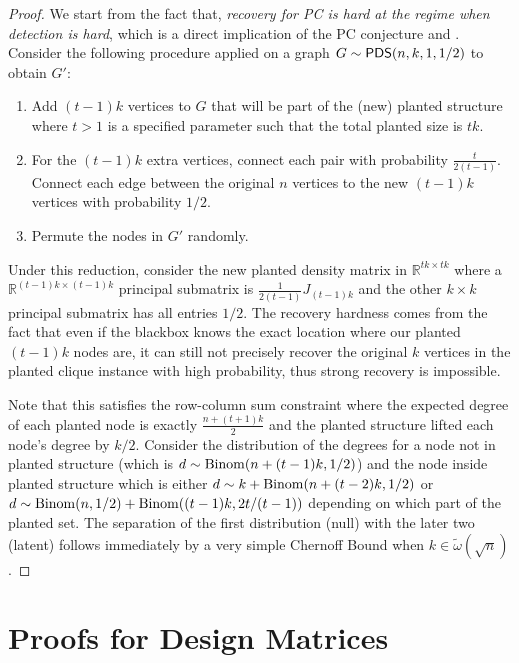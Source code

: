 \documentclass[final,12pt]{colt2023} %
\newcommand\1[1]{\mathbb{I}_{\left\{#1\right\}}}
\begin{document}
\begin{proof}
We start from the fact that, \textit{recovery for \textup{PC} is hard at the regime when detection is hard}, which is a direct implication of the PC conjecture and . Consider the following procedure applied on a graph $G\sim \mathsf{PDS}(n, k, 1, 1/2)$ to obtain $G'$:\begin{enumerate}
    \item Add $(t-1)k$ vertices to $G$ that will be part of the (new) planted structure where $t>1$ is a specified parameter such that the total planted size is $tk$. 
    \item For the $(t-1)k$ extra vertices, connect each pair with probability $\frac{t}{2(t-1)}$. Connect each edge between the original $n$ vertices to the new $(t-1)k$ vertices with probability $1/2$.
    \item Permute the nodes in $G'$ randomly.
\end{enumerate}
Under this reduction, consider the new planted density matrix in $\mathbb{R}^{tk\times tk}$ where a $\mathbb{R}^{(t-1)k\times (t-1)k}$ principal submatrix is $\frac{1}{2(t-1)} J_{(t-1)k}$ and the other $k\times k$ principal submatrix has all entries $1/2$. The recovery hardness comes from the fact that even if the blackbox knows the exact location where our planted $(t-1)k$ nodes are, it can still not precisely recover the original $k$ vertices in the planted clique instance with high probability, thus strong recovery is impossible. 

\spac Note that this satisfies the row-column sum constraint where the expected degree of each planted node is exactly $\frac{n+(t+1)k}{2}$ and the planted structure lifted each node's degree by $k/2$. Consider the distribution of the degrees for a node not in planted structure (which is $d\sim {\rm Binom}(n+(t-1)k, 1/2)$) and the node inside planted structure which is either $d\sim k+{\rm Binom}(n+(t-2)k, 1/2)$ or $d\sim {\rm Binom}(n, 1/2)+{\rm Binom}((t-1)k, 2t/(t-1))$ depending on which part of the planted set. The separation of the first distribution (null) with the later two (latent) follows immediately by a very simple Chernoff Bound when $k\in\tilde \omega(\sqrt{n})$.
\end{proof}


\section{Proofs for Design Matrices}
\end{document}
